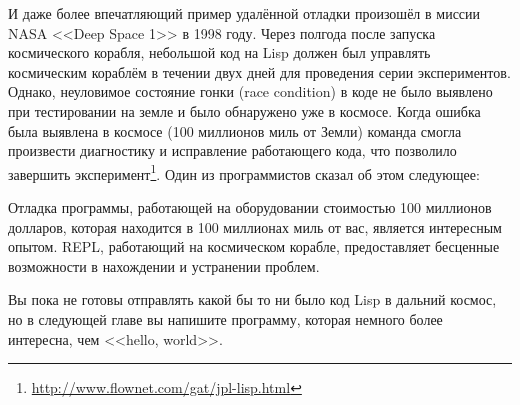 И даже более впечатляющий пример удалённой отладки произошёл в миссии NASA <<Deep Space 1>>
в 1998 году. Через полгода после запуска космического корабля, небольшой код на Lisp
должен был управлять космическим кораблём в течении двух дней для проведения серии
экспериментов. Однако, неуловимое состояние гонки (race condition) в коде не было выявлено
при тестировании на земле и было обнаружено уже в космосе. Когда ошибка была выявлена в
космосе (100 миллионов миль от Земли) команда смогла произвести диагностику и исправление
работающего кода, что позволило завершить
эксперимент\footnote{\url{http://www.flownet.com/gat/jpl-lisp.html}}. Один из
программистов сказал об этом следующее:

Отладка программы, работающей на оборудовании стоимостью 100 миллионов долларов, которая
находится в 100 миллионах миль от вас, является интересным опытом. REPL, работающий на
космическом корабле, предоставляет бесценные возможности в нахождении и устранении
проблем.

Вы пока не готовы отправлять какой бы то ни было код Lisp в дальний космос, но в следующей
главе вы напишите программу, которая немного более интересна, чем <<hello, world>>.

